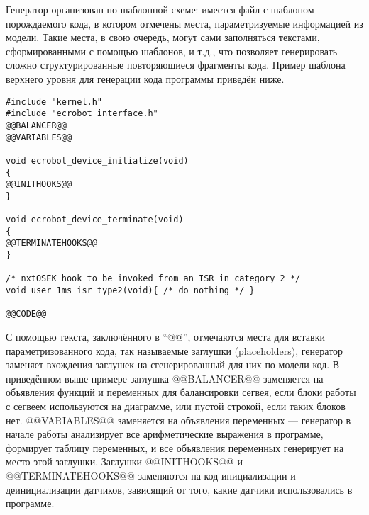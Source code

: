 Генератор организован по шаблонной схеме: имеется файл с шаблоном порождаемого кода, 
в котором отмечены места, параметризуемые информацией из модели. Такие места, в свою 
очередь, могут сами заполняться текстами, сформированными с помощью шаблонов, и т.д., 
что позволяет генерировать сложно структурированные  повторяющиеся фрагменты кода. 
Пример шаблона верхнего уровня для генерации кода программы приведён ниже.

\vspace{5mm}
\begin{minipage}{\linewidth}
\begin{verbatim}
#include "kernel.h"
#include "ecrobot_interface.h"
@@BALANCER@@
@@VARIABLES@@

void ecrobot_device_initialize(void)
{
@@INITHOOKS@@
}

void ecrobot_device_terminate(void)
{
@@TERMINATEHOOKS@@
}

/* nxtOSEK hook to be invoked from an ISR in category 2 */
void user_1ms_isr_type2(void){ /* do nothing */ }

@@CODE@@
\end{verbatim}
\end{minipage}
\vspace{5mm}

С помощью текста, заключённого в "`@@"', отмечаются места для вставки параметризованного 
кода, так называемые заглушки (placeholders), генератор заменяет вхождения заглушек 
на сгенерированный для них по модели код. В приведённом выше примере заглушка @@BALANCER@@ 
заменяется на объявления функций и переменных для балансировки сегвея, если блоки 
работы с сегвеем используются на диаграмме, или пустой строкой, если таких блоков нет. 
@@VARIABLES@@ заменяется на объявления переменных --- генератор в начале работы анализирует 
все арифметические выражения в программе, формирует таблицу переменных, и все объявления 
переменных генерирует на место этой заглушки. Заглушки @@INITHOOKS@@ и @@TERMINATEHOOKS@@ 
заменяются на код инициализации и деинициализации датчиков, зависящий от того, какие 
датчики использовались в программе. 

